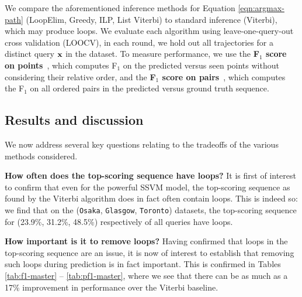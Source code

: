 %

We compare the aforementioned inference methods for Equation \ref{eqn:argmax-path} ({\sc LoopElim}, {\sc Greedy}, {\sc ILP}, {\sc List Viterbi})
to standard inference ({\sc Viterbi}), which may produce loops.
We evaluate each algorithm using leave-one-query-out cross validation (LOOCV),
\ie in each round, we hold out all trajectories for a distinct query $\mathbf{x}$ in the dataset.
To measure performance,
we use 
the {\bf F$_1$ score on points}~\cite{ijcai15}, which computes F$_1$ on the predicted versus seen points
without considering their relative order,
and the {\bf F$_1$ score on pairs}~\cite{cikm16paper}, which computes the F$_1$ on all ordered pairs in the predicted versus ground truth sequence. %




%
\subsection{Results and discussion}

We now address several key questions relating to the tradeoffs of the various methods considered.

\textbf{How often does the top-scoring sequence have loops?}
It is first of interest to confirm that
even for the powerful SSVM model,
the top-scoring sequence as found by the Viterbi algorithm does in fact often contain loops.
This is indeed so: we find that on the ({\tt Osaka}, {\tt Glasgow}, {\tt Toronto}) datasets, the top-scoring sequence for (23.9\%, 31.2\%, 48.5\%) respectively of all queries have loops.

\textbf{How important is it to remove loops?}
Having confirmed that loops in the top-scoring sequence are an issue,
it is now of interest to establish that removing such loops during prediction is in fact important.
This is confirmed in Tables \ref{tab:f1-master} -- \ref{tab:pf1-master},
where we see that there can be as much as a 17\% improvement in performance over the {\sc Viterbi} baseline.

